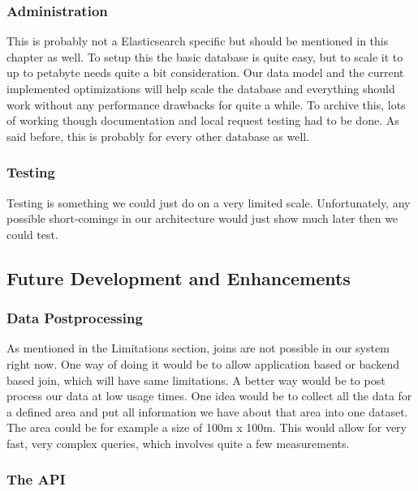 \subsubsection{Administration}\label{administration}

This is probably not a Elasticsearch specific but should be mentioned in
this chapter as well. To setup this the basic database is quite easy,
but to scale it to up to petabyte needs quite a bit consideration. Our
data model and the current implemented optimizations will help scale the
database and everything should work without any performance drawbacks
for quite a while. To archive this, lots of working though documentation
and local request testing had to be done. As said before, this is
probably for every other database as well.

\subsubsection{Testing}\label{testing}

Testing is something we could just do on a very limited scale.
Unfortunately, any possible short-comings in our architecture would just
show much later then we could test.

\subsection{Future Development and
Enhancements}\label{future-development-and-enhancements}

\subsubsection{Data Postprocessing}\label{data-postprocessing}

As mentioned in the Limitations section, joins are not possible in our
system right now. One way of doing it would be to allow application
based or backend based join, which will have same limitations. A better
way would be to post process our data at low usage times. One idea would
be to collect all the data for a defined area and put all information we
have about that area into one dataset. The area could be for example a
size of 100m x 100m. This would allow for very fast, very complex
queries, which involves quite a few measurements.

\subsubsection{The API}\label{the-api}

